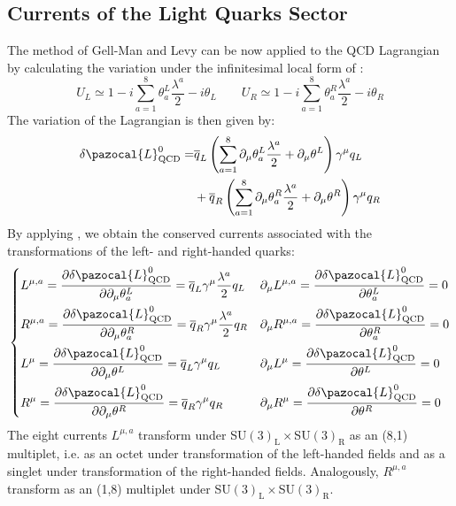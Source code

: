 \documentclass[../main.tex]{subfiles}
\begin{document}
\subsection{Currents of the Light Quarks Sector}
The method of Gell-Man and Levy can be now applied to the QCD Lagrangian by calculating the variation under the infinitesimal local form of :
\[
U_{L}\simeq1-i\sum_{a=1}^8\theta_a^{L}\frac{\lambda^a}{2}-i\theta_{L} \qquad U_{R}\simeq1-i\sum_{a=1}^8\theta_a^{R}\frac{\lambda^a}{2}-i\theta_{R}
\]
The variation of the Lagrangian is then given by:
\begin{align*}    
\delta\pazocal{L}_{\text{QCD}}^0=&\overline{q}_L\left(\sum_{a=1}^8\partial_\mu\theta_a^L\frac{\lambda^a}{2}+\partial_\mu\theta^L\right)\gamma^\mu q_L\\
&+\overline{q}_R\left(\sum_{a=1}^8\partial_\mu\theta_a^R\frac{\lambda^a}{2}+\partial_\mu\theta^R\right)\gamma^\mu q_R
\end{align*}
By applying , we obtain the conserved currents associated with the transformations of the left- and right-handed quarks:
\[
\left\{
\begin{aligned}
&L^{\mu,a}=\frac{\partial\delta\pazocal{L}^0_{\text{QCD}}}{\partial\partial_\mu\theta_a^L}=\overline{q}_L\gamma^\mu\frac{\lambda^a}{2}q_L &&\partial_\mu L^{\mu,a}=\frac{\partial\delta\pazocal{L}^0_{\text{QCD}}}{\partial\theta_a^L}=0\\
&R^{\mu,a}=\frac{\partial\delta\pazocal{L}^0_{\text{QCD}}}{\partial\partial_\mu\theta_a^R}=\overline{q}_R\gamma^\mu\frac{\lambda^a}{2}q_R &&\partial_\mu R^{\mu,a}=\frac{\partial\delta\pazocal{L}^0_{\text{QCD}}}{\partial\theta_a^R}=0\\
&L^{\mu}=\frac{\partial\delta\pazocal{L}^0_{\text{QCD}}}{\partial\partial_\mu\theta^L}=\overline{q}_L\gamma^\mu q_L &&\partial_\mu L^{\mu}=\frac{\partial\delta\pazocal{L}^0_{\text{QCD}}}{\partial\theta^L}=0\\
&R^{\mu}=\frac{\partial\delta\pazocal{L}^0_{\text{QCD}}}{\partial\partial_\mu\theta^R}=\overline{q}_R\gamma^\mu q_R &&\partial_\mu R^{\mu}=\frac{\partial\delta\pazocal{L}^0_{\text{QCD}}}{\partial\theta^R}=0
\end{aligned}
\right.
\]
The eight currents $L^{\mu,a}$ transform under SU$(3)_{\text{L}}\times$SU$(3)_{\text{R}}$ as an (8,1) multiplet, i.e. as an octet under transformation of the left-handed fields and as a singlet under transformation of the right-handed fields. Analogously, $R^{\mu,a}$ transform as an (1,8) multiplet under SU$(3)_{\text{L}}\times$SU$(3)_{\text{R}}$.\\
\end{document}
